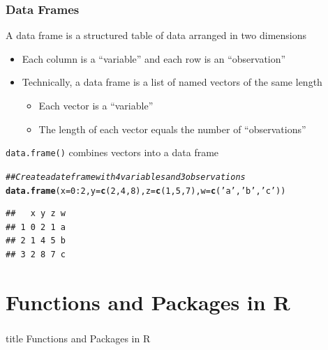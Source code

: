 \documentclass{beamer}\usepackage[]{graphicx}\usepackage[]{color}
\makeatletter
\newcommand{\hlnum}[1]{\textcolor[rgb]{0.686,0.059,0.569}{#1}}%
\newcommand{\hlstr}[1]{\textcolor[rgb]{0.192,0.494,0.8}{#1}}%
\newcommand{\hlcom}[1]{\textcolor[rgb]{0.678,0.584,0.686}{\textit{#1}}}%
\newcommand{\hlopt}[1]{\textcolor[rgb]{0,0,0}{#1}}%
\newcommand{\hlstd}[1]{\textcolor[rgb]{0.345,0.345,0.345}{#1}}%
\newcommand{\hlkwc}[1]{\textcolor[rgb]{0.333,0.667,0.333}{#1}}%
\newcommand{\hlkwd}[1]{\textcolor[rgb]{0.737,0.353,0.396}{\textbf{#1}}}%
\newenvironment{kframe}{%
 \def\at@end@of@kframe{}%
 \ifinner\ifhmode%
  \def\at@end@of@kframe{\end{minipage}}%
  \begin{minipage}{\columnwidth}%
 \fi\fi%
 \def\FrameCommand##1{\hskip\@totalleftmargin \hskip-\fboxsep
 \colorbox{shadecolor}{##1}\hskip-\fboxsep
     \hskip-\linewidth \hskip-\@totalleftmargin \hskip\columnwidth}%
 \MakeFramed {\advance\hsize-\width
   \@totalleftmargin\z@ \linewidth\hsize
   \@setminipage}}%
 {\par\unskip\endMakeFramed%
 \at@end@of@kframe}
\newenvironment{knitrout}{}{} %
\makeatother
\begin{document}
\begin{frame}[fragile]\frametitle{Data Frames}
    A data frame is a structured table of data arranged in two dimensions
    \begin{itemize}
        \item Each column is a ``variable'' and each row is an ``observation''
        \item Technically, a data frame is a list of named vectors of the same length
        \begin{itemize}
            \item Each vector is a ``variable''
            \item The length of each vector equals the number of ``observations''
        \end{itemize}
    \end{itemize}
    \vspace{3ex}
    \texttt{data.frame()} combines vectors into a data frame
\begin{knitrout}\footnotesize
{}\color{fgcolor}\begin{kframe}
\begin{alltt}
\hlcom{## Create a date frame with 4 variables and 3 observations}
\hlkwd{data.frame}\hlstd{(}\hlkwc{x} \hlstd{=} \hlnum{0}\hlopt{:}\hlnum{2}\hlstd{,} \hlkwc{y} \hlstd{=} \hlkwd{c}\hlstd{(}\hlnum{2}\hlstd{,} \hlnum{4}\hlstd{,} \hlnum{8}\hlstd{),} \hlkwc{z} \hlstd{=} \hlkwd{c}\hlstd{(}\hlnum{1}\hlstd{,} \hlnum{5}\hlstd{,} \hlnum{7}\hlstd{),} \hlkwc{w} \hlstd{=} \hlkwd{c}\hlstd{(}\hlstr{'a'}\hlstd{,} \hlstr{'b'}\hlstd{,} \hlstr{'c'}\hlstd{))}
\end{alltt}
\begin{verbatim}
##   x y z w
## 1 0 2 1 a
## 2 1 4 5 b
## 3 2 8 7 c
\end{verbatim}
\end{kframe}
\end{knitrout}
\end{frame}

\section{Functions and Packages in R}
\label{functions}
\begin{frame}\frametitle{}
    \vfill
    \centering
    \begin{beamercolorbox}[center]{title}
        \Large Functions and Packages in R
    \end{beamercolorbox}
    \vfill
\end{frame}
\end{document}
